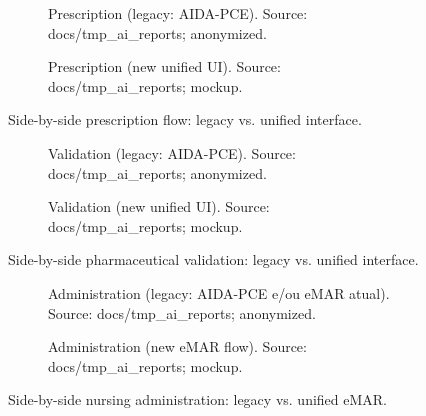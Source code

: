 \begin{figure}[htbp]
    \centering
    \begin{subfigure}[t]{0.44\textwidth}
        \centering
        \caption{Prescription (legacy: AIDA-PCE). Source: docs/tmp\_ai\_reports; anonymized.}
        \label{fig:prescription_legacy}
    \end{subfigure}
    \begin{subfigure}[t]{0.44\textwidth}
        \centering
        \caption{Prescription (new unified UI). Source: docs/tmp\_ai\_reports; mockup.}
        \label{fig:prescription_new}
    \end{subfigure}
    \caption{Side-by-side prescription flow: legacy vs. unified interface.}
\end{figure}

\begin{figure}[htbp]
    \centering
    \begin{subfigure}[t]{0.37\textwidth}
        \centering
        \caption{Validation (legacy: AIDA-PCE). Source: docs/tmp\_ai\_reports; anonymized.}
        \label{fig:validation_legacy}
    \end{subfigure}
    \begin{subfigure}[t]{0.37\textwidth}
        \centering
        \caption{Validation (new unified UI). Source: docs/tmp\_ai\_reports; mockup.}
        \label{fig:validation_new}
    \end{subfigure}
    \caption{Side-by-side pharmaceutical validation: legacy vs. unified interface.}
\end{figure}

\begin{figure}[htbp]
    \centering
    \begin{subfigure}[t]{0.37\textwidth}
        \centering
        \caption{Administration (legacy: AIDA-PCE e/ou eMAR atual). Source: docs/tmp\_ai\_reports; anonymized.}
        \label{fig:administration_legacy}
    \end{subfigure}
    \begin{subfigure}[t]{0.37\textwidth}
        \centering
        \caption{Administration (new eMAR flow). Source: docs/tmp\_ai\_reports; mockup.}
        \label{fig:administration_new}
    \end{subfigure}
    \caption{Side-by-side nursing administration: legacy vs. unified eMAR.}
\end{figure}

